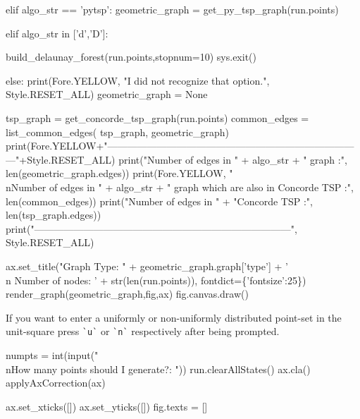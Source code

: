 elif algo_str == 'pytsp':
     geometric_graph = get_py_tsp_graph(run.points)

elif algo_str in ['d','D']:

     build_delaunay_forest(run.points,stopnum=10) 
     sys.exit()

else:
      print(Fore.YELLOW, "I did not recognize that option.", Style.RESET_ALL)
      geometric_graph = None

tsp_graph = get_concorde_tsp_graph(run.points)
common_edges = list_common_edges( tsp_graph, geometric_graph)
print(Fore.YELLOW+"------------------------------------------------------------------------------"+Style.RESET_ALL)
print("Number of edges in " + algo_str + " graph                                :", len(geometric_graph.edges))
print(Fore.YELLOW, "\\nNumber of edges in " + algo_str + " graph which are also in Concorde TSP :", len(common_edges))
print("Number of edges in " + "Concorde TSP                              :", len(tsp_graph.edges))
print("------------------------------------------------------------------------------", Style.RESET_ALL)


ax.set_title("Graph Type: " + geometric_graph.graph['type'] + '\\n Number of nodes: ' + str(len(run.points)), fontdict=\{'fontsize':25\})
render_graph(geometric_graph,fig,ax)
fig.canvas.draw()
\nwendcode{}\nwdocspar

If you want to enter a uniformly or non-uniformly distributed point-set in the unit-square press \verb|`u`| or \verb|`n`|
respectively after being prompted. 

\nwenddocs{}\endmoddef\nwstartdeflinemarkup{}\nwenddeflinemarkup
numpts = int(input("\\nHow many points should I generate?: ")) 
run.clearAllStates()
ax.cla()
applyAxCorrection(ax)

ax.set_xticks([])
ax.set_yticks([])
fig.texts = []
                 
